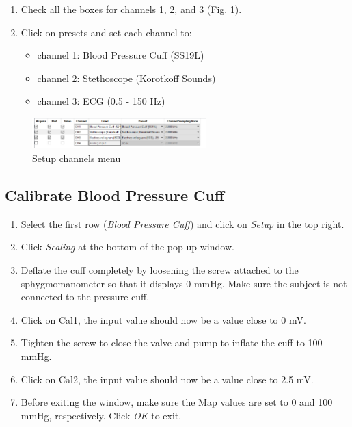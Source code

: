 \documentclass{article}
\begin{document}
\begin{enumerate}
	\begin{enumerate}
		\item Check all the boxes for channels 1, 2, and 3 (Fig. \ref{setup}).
		\item Click on presets and set each channel to:\begin{itemize}
			\item channel 1: Blood Pressure Cuff (SS19L)
			\item channel 2: Stethoscope (Korotkoff Sounds)
			\item channel 3: ECG (0.5 - 150 Hz)
		\end{itemize}
	\end{enumerate}
\end{enumerate}

\begin{figure}[h]
\centering\includegraphics[width=0.6\textwidth]{../images/BP_7.png}
\caption{Setup channels menu}
\label{setup}
\end{figure}

\subsection*{Calibrate Blood Pressure Cuff}
\begin{enumerate}
	\item Select the first row (\textit{Blood Pressure Cuff}) and click on \textit{Setup} in the top right.
	\item Click \textit{Scaling} at the bottom of the pop up window.

	\item Deflate the cuff completely by loosening the screw attached to the sphygmomanometer so that it displays 0 mmHg. Make sure the subject is not connected to the pressure cuff.
	\item Click on Cal1, the input value should now be a value close to 0 mV.
	\item Tighten the screw to close the valve and pump to inflate the cuff to 100 mmHg.
	\item Click on Cal2, the input value should now be a value close to 2.5 mV.
	\item Before exiting the window, make sure the Map values are set to 0 and 100 mmHg, respectively. Click \textit{OK} to exit.
\end{enumerate}
\end{document}
